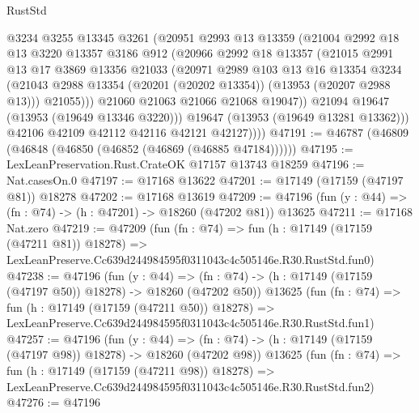 \begin{lexlean}{RustStd}
\begin{coremodule}
                @3234
                @3255
                @13345
                @3261
                (@20951
                  @2993
                  @13
                  @13359
                  (@21004
                    @2992
                    @18
                    @13
                    @3220
                    @13357
                    @3186
                    @912
                    (@20966
                      @2992
                      @18
                      @13357
                      (@21015
                        @2991
                        @13
                        @17
                        @3869
                        @13356
                        @21033
                        (@20971
                          @2989
                          @103
                          @13
                          @16
                          @13354
                          @3234
                          (@21043 @2988 @13354 (@20201 (@20202 @13354)) (@13953 (@20207 @2988 @13)))
                          @21055)))
                    @21060
                    @21063
                    @21066
                    @21068
                    @19047))
                @21094
                @19647
                (@13953 (@19649 @13346 @3220)))
              @19647
              (@13953 (@19649 @13281 @13362)))
            @42106
            @42109
            @42112
            @42116
            @42121
            @42127))))
@47191 := @46787 (@46809 (@46848 (@46850 (@46852 (@46869 (@46885 @47184))))))
@47195 := LexLeanPreservation.Rust.CrateOK @17157 @13743 @18259
@47196 := Nat.casesOn.{0}
@47197 := @17168 @13622
@47201 := @17149 (@17159 (@47197 @81)) @18278
@47202 := @17168 @13619
@47209 := @47196 (fun (y : @44) => (fn : @74) -> (h : @47201) -> @18260 (@47202 @81)) @13625
@47211 := @17168 Nat.zero
@47219 := @47209
    (fun (fn : @74) =>
    fun (h : @17149 (@17159 (@47211 @81)) @18278) =>
    LexLeanPreserve.Cc639d244984595f0311043c4c505146e.R30.RustStd.fun0)
@47238 := @47196
    (fun (y : @44) =>
    (fn : @74) -> (h : @17149 (@17159 (@47197 @50)) @18278) -> @18260 (@47202 @50))
    @13625
    (fun (fn : @74) =>
    fun (h : @17149 (@17159 (@47211 @50)) @18278) =>
    LexLeanPreserve.Cc639d244984595f0311043c4c505146e.R30.RustStd.fun1)
@47257 := @47196
    (fun (y : @44) =>
    (fn : @74) -> (h : @17149 (@17159 (@47197 @98)) @18278) -> @18260 (@47202 @98))
    @13625
    (fun (fn : @74) =>
    fun (h : @17149 (@17159 (@47211 @98)) @18278) =>
    LexLeanPreserve.Cc639d244984595f0311043c4c505146e.R30.RustStd.fun2)
@47276 := @47196

\end{coremodule}
\end{lexlean}
